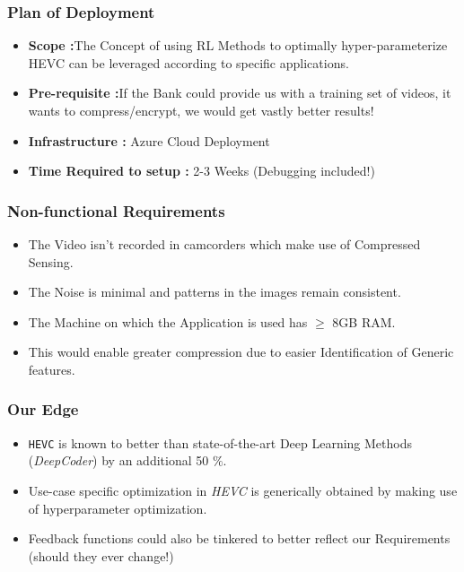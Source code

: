 \documentclass{beamer}
\begin{document}
\begin{frame}
    \frametitle{Plan of Deployment}
    \begin{itemize}
        \item \textbf{Scope :}The Concept of using RL Methods to optimally hyper-parameterize HEVC can be leveraged according to specific applications.
        \pause
        \item \textbf{Pre-requisite :}If the Bank could provide us with a training set of videos, it wants to compress/encrypt, we would get vastly better results! 
        \pause
        \item \textbf{Infrastructure : } Azure Cloud Deployment
        \pause
        \item \textbf{Time Required to setup :} 2-3 Weeks (Debugging included!)
    \end{itemize}

\end{frame}


\begin{frame}
    \frametitle{Non-functional Requirements}

    \begin{itemize}
        \item The Video isn't recorded in camcorders which make use of Compressed Sensing.
        \item The Noise is minimal and patterns in the images remain consistent.
        \item The Machine on which the Application is used has $\geq$ 8GB RAM.
        \item This would enable greater compression due to easier Identification of Generic features.
    \end{itemize}
\end{frame}

\begin{frame}
    \frametitle{Our Edge}
    \begin{itemize}
        \item \texttt{HEVC} is known to better than state-of-the-art Deep Learning Methods (\textit{DeepCoder}) by an additional 50 $\%$.
        \pause
        \item Use-case specific optimization in \textit{HEVC} is generically obtained by making use of hyperparameter optimization.
        \pause
        \item Feedback functions could also be tinkered to better reflect our Requirements (should they ever change!)
    \end{itemize}
\end{frame}
\end{document}
